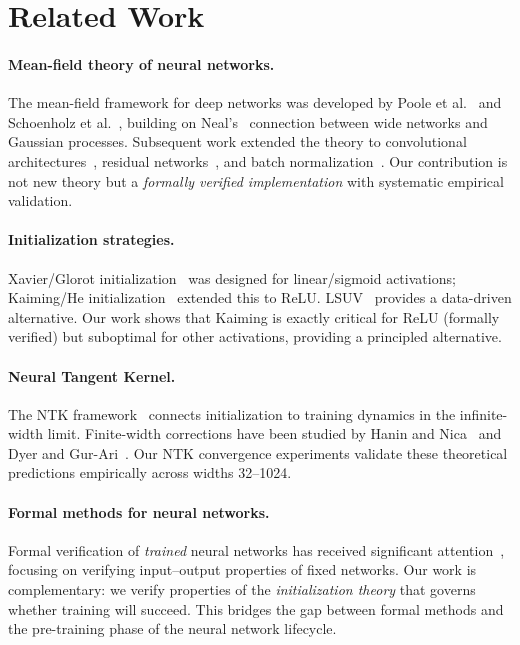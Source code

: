 \documentclass[10pt]{article}
\begin{document}
\section{Related Work}
\label{sec:related}

\paragraph{Mean-field theory of neural networks.}
The mean-field framework for deep networks was developed by Poole et al.~\cite{poole2016exponential} and Schoenholz et al.~\cite{schoenholz2017deep}, building on Neal's~\cite{neal1996bayesian} connection between wide networks and Gaussian processes.
Subsequent work extended the theory to convolutional architectures~\cite{xiao2018dynamical}, residual networks~\cite{yang2017mean}, and batch normalization~\cite{yang2019mean}.
Our contribution is not new theory but a \emph{formally verified implementation} with systematic empirical validation.

\paragraph{Initialization strategies.}
Xavier/Glorot initialization~\cite{glorot2010understanding} was designed for linear/sigmoid activations; Kaiming/He initialization~\cite{he2015delving} extended this to ReLU.
LSUV~\cite{mishkin2016all} provides a data-driven alternative.
Our work shows that Kaiming is exactly critical for ReLU (formally verified) but suboptimal for other activations, providing a principled alternative.

\paragraph{Neural Tangent Kernel.}
The NTK framework~\cite{jacot2018neural} connects initialization to training dynamics in the infinite-width limit.
Finite-width corrections have been studied by Hanin and Nica~\cite{hanin2020finite} and Dyer and Gur-Ari~\cite{dyer2020asymptotics}.
Our NTK convergence experiments validate these theoretical predictions empirically across widths 32--1024.

\paragraph{Formal methods for neural networks.}
Formal verification of \emph{trained} neural networks has received significant attention~\cite{katz2017reluplex,huang2017safety,singh2019abstract}, focusing on verifying input--output properties of fixed networks.
Our work is complementary: we verify properties of the \emph{initialization theory} that governs whether training will succeed.
This bridges the gap between formal methods and the pre-training phase of the neural network lifecycle.
\end{document}
